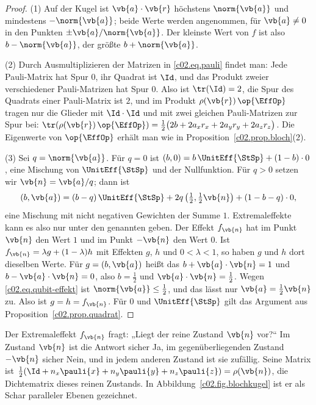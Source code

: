 \begin{proof}
  (1) Auf der Kugel ist $\vb{a}\cdot\vb{r}$ höchstens $\norm{\vb{a}}$ und mindestens
  $-\norm{\vb{a}}$; beide Werte werden angenommen, für $\vb{a} \neq 0$ in den Punkten
  $\pm\vb{a}/\norm{\vb{a}}$. Der kleinste Wert von $f$ ist also $b - \norm{\vb{a}}$, der
  größte $b + \norm{\vb{a}}$.

  (2) Durch Ausmultiplizieren der Matrizen in \eqref{c02.eq.pauli} findet man: Jede
  Pauli-Matrix hat Spur $0$, ihr Quadrat ist $\Id$, und das Produkt zweier verschiedener
  Pauli-Matrizen hat Spur $0$. Also ist $\tr(\Id) = 2$, die Spur des Quadrats einer
  Pauli-Matrix ist $2$, und im Produkt $\rho(\vb{r})\,\op{\EffOp}$ tragen nur die Glieder mit
  $\Id\cdot\Id$ und mit zwei gleichen Pauli-Matrizen zur Spur bei:
  $\tr(\rho(\vb{r})\,\op{\EffOp}) = \tfrac12\bigl(2b + 2 a_x r_x + 2 a_y r_y + 2 a_z r_z\bigr)$.
  Die Eigenwerte von $\op{\EffOp}$ erhält man wie in Proposition~\ref{c02.prop.bloch}(2).

  (3) Sei $q = \norm{\vb{a}}$. Für $q = 0$ ist
  $(b, 0) = b\, \UnitEff{\StSp} + (1 - b)\cdot 0$, eine Mischung von $\UnitEff{\StSp}$ und
  der Nullfunktion. Für $q > 0$ setzen wir $\vb{n} = \vb{a}/q$; dann ist
  \begin{equation*}
    (b, \vb{a}) = (b - q)\, \UnitEff{\StSp} + 2q\, \bigl(\tfrac12, \tfrac12\vb{n}\bigr) + (1 - b - q)\cdot 0 ,
  \end{equation*}
  eine Mischung mit nicht negativen Gewichten der Summe $1$. Extremaleffekte kann es also
  nur unter den genannten geben. Der Effekt $f_{\vb{n}}$ hat im Punkt $\vb{n}$ den Wert
  $1$ und im Punkt $-\vb{n}$ den Wert $0$. Ist $f_{\vb{n}} = \lambda g + (1-\lambda) h$ mit
  Effekten $g$, $h$ und $0 < \lambda < 1$, so haben $g$ und $h$ dort dieselben Werte. Für
  $g = (b, \vb{a})$ heißt das $b + \vb{a}\cdot\vb{n} = 1$ und $b - \vb{a}\cdot\vb{n} = 0$,
  also $b = \tfrac12$ und $\vb{a}\cdot\vb{n} = \tfrac12$. Wegen
  \eqref{c02.eq.qubit-effekt} ist $\norm{\vb{a}} \leq \tfrac12$, und das lässt nur
  $\vb{a} = \tfrac12\vb{n}$ zu. Also ist $g = h = f_{\vb{n}}$. Für $0$ und
  $\UnitEff{\StSp}$ gilt das Argument aus Proposition~\ref{c02.prop.quadrat}.
\end{proof}

Der Extremaleffekt $f_{\vb{n}}$ fragt: „Liegt der reine Zustand $\vb{n}$ vor?“ Im Zustand
$\vb{n}$ ist die Antwort sicher Ja, im gegenüberliegenden Zustand $-\vb{n}$ sicher Nein, und
in jedem anderen Zustand ist sie zufällig. Seine Matrix ist
$\tfrac12(\Id + n_x\pauli{x} + n_y\pauli{y} + n_z\pauli{z}) = \rho(\vb{n})$, die Dichtematrix
dieses reinen Zustands. In Abbildung~\ref{c02.fig.blochkugel} ist er als Schar paralleler
Ebenen gezeichnet.


